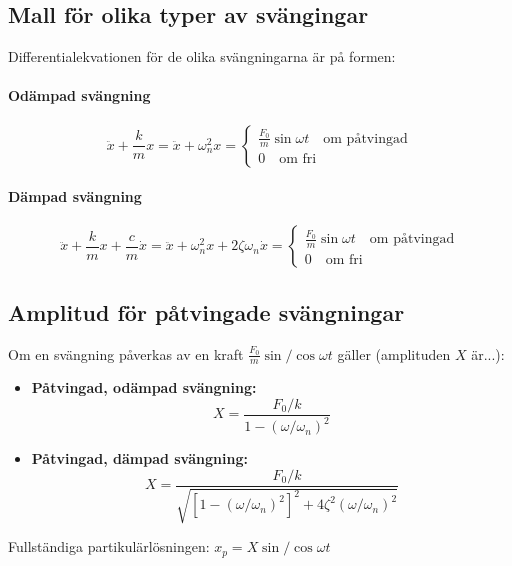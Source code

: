 \documentclass{article}
\newenvironment{ankiflashcard}[1]{}{}
\begin{document}
\begin{paracol}{2}
\subsection{Mall för olika typer av svängingar}
Differentialekvationen för de olika svängningarna är på formen:

\begin{ankiflashcard}{Ange basekvationerna för odämpade svängingar}
    
\paragraph{Odämpad svängning}
$$\ddot x + \frac{k}{m} x = \ddot x+\omega_n^2 x=\begin{cases}
\frac{F_0}{m} \sin \omega t \quad\text{om påtvingad}\\
0 \quad\text{om fri}
\end{cases}
$$
\end{ankiflashcard}

\begin{ankiflashcard}{Ange basekvationerna för dämpade svängingar}
\paragraph{Dämpad svängning}
$$\ddot x + \frac{k}{m} x +  \frac{c}{m} \dot x = \ddot x+\omega_n^2 x+2\zeta \omega_n \dot x=\begin{cases}
\frac{F_0}{m} \sin \omega t \quad\text{om påtvingad}\\
0 \quad \text{om fri}
\end{cases}$$
\end{ankiflashcard}

\begin{ankiflashcard}{Skriv upp formler för påtvingade svängningar}
    \subsection{Amplitud för påtvingade svängningar}
    Om en svängning påverkas av en kraft $\frac{F_0}{m}\sin/\cos \omega t$ gäller (amplituden $X$ är...):
    \begin{itemize}
        \item \textbf{Påtvingad, odämpad svängning: }$$X=\frac{F_0/k}{1-(\omega/\omega_n)^2}$$
        \item \textbf{Påtvingad, dämpad svängning: }$$X=\frac{F_0/k}{\sqrt{\left[1-(\omega/\omega_n)^2\right]^2+4\zeta^2(\omega/\omega_n)^2}}$$
    \end{itemize}
    Fullständiga partikulärlösningen: $x_p=X\sin / \cos \omega t$
\end{ankiflashcard}


\end{paracol}
\end{document}
